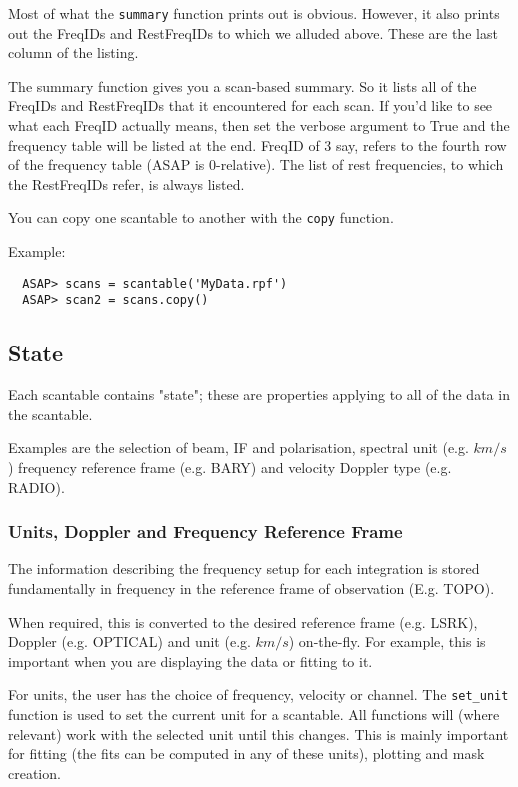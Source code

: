 \documentclass[11pt]{article}
\newcommand{\cmd}[1]{{\tt #1}}
\begin{document}
Most of what the \cmd{summary} function  prints out is obvious. However,
it also prints out the FreqIDs and RestFreqIDs to which we alluded above. 
These are the last column of the listing.

The summary function gives you a scan-based summary.  So it lists all of
the FreqIDs and RestFreqIDs that it encountered for each scan.  If you'd
like to see what each FreqID actually means, then set the verbose
argument to True and the frequency table will be listed at the end. 
FreqID of 3 say, refers to the fourth row of the frequency table (ASAP
is 0-relative). The list of rest frequencies, to which the RestFreqIDs
refer, is always listed.

You can copy one scantable to another with the \cmd{copy} function.

Example:

\begin{verbatim}
  ASAP> scans = scantable('MyData.rpf')
  ASAP> scan2 = scans.copy()
\end{verbatim}

\subsection{State}

Each scantable contains "state"; these are properties  applying to all
of the data in the scantable.  

Examples are the selection of beam, IF and polarisation,  spectral unit
(e.g. $km/s$) frequency reference frame (e.g. BARY) and velocity Doppler
type (e.g. RADIO).

\subsubsection{Units, Doppler and Frequency Reference Frame}

The information describing the frequency setup for each integration
is stored fundamentally in frequency in the reference frame
of observation (E.g. TOPO).   

When required, this is converted to the desired reference frame (e.g. LSRK),
Doppler (e.g. OPTICAL) and unit (e.g. $km/s$) on-the-fly.  For example,
this is important when you are displaying the data or fitting to it.

For units, the user has the choice of frequency, velocity or channel.
The \cmd{set\_unit} function is used to set the current unit for a
scantable. All functions will (where relevant) work with the selected
unit until this changes. This is mainly important for fitting (the fits
can be computed in any of these units), plotting and mask creation. 
\end{document}
